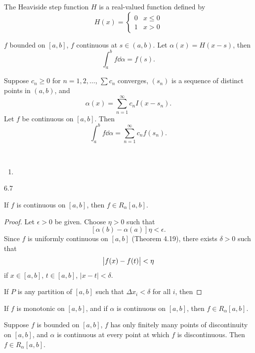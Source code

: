 \begin{example}
The Heaviside step function $H$ is a real-valued function defined by
\[H(x)=\begin{cases}
0&x\le0\\
1&x>0
\end{cases}\]

\begin{proposition*}
$f$ bounded on $[a,b]$, $f$ continuous at $s\in(a,b)$. Let $\alpha(x)=H(x-s)$, then
\[\int_a^b f\dd{\alpha}=f(s).\]
\end{proposition*}

\begin{proposition*}
Suppose $c_n\ge0$ for $n=1,2,\dots$, $\sum c_n$ converges, $(s_n)$ is a sequence of distinct points in $(a,b)$, and
\[\alpha(x)=\sum_{n=1}^{\infty}c_n I(x-s_n).\]
Let $f$ be continuous on $[a,b]$. Then
\[\int_a^b f\dd{\alpha}=\sum_{n=1}^{\infty}c_n f(s_n).\]
\end{proposition*}
\end{example}

\begin{proposition} \
\begin{enumerate}[label=(\roman*)]
\item 
\end{enumerate}
\end{proposition}

6.7

\begin{proposition}
If $f$ is continuous on $[a,b]$, then $f\in R_\alpha[a,b]$.
\end{proposition}

\begin{proof}
Let $\epsilon>0$ be given. Choose $\eta>0$ such that
\[[\alpha(b)-\alpha(a)]\eta<\epsilon.\]
Since $f$ is uniformly continuous on $[a,b]$ (Theorem 4.19), there exists $\delta>0$ such that
\[\left|f(x)-f(t)\right|<\eta\]
if $x\in[a,b]$, $t\in[a,b]$, $|x-t|<\delta$.

If $P$ is any partition of $[a,b]$ such that $\Delta x_i<\delta$ for all $i$, then
\end{proof}

\begin{proposition}
If $f$ is monotonic on $[a,b]$, and if $\alpha$ is continuous on $[a,b]$, then $f\in R_\alpha[a,b]$.
\end{proposition}

\begin{proposition}
Suppose $f$ is bounded on $[a,b]$, $f$ has only finitely many points of discontinuity on $[a,b]$, and $\alpha$ is continuous at every point at which $f$ is discontinuous. Then $f\in R_\alpha[a,b]$.
\end{proposition}

